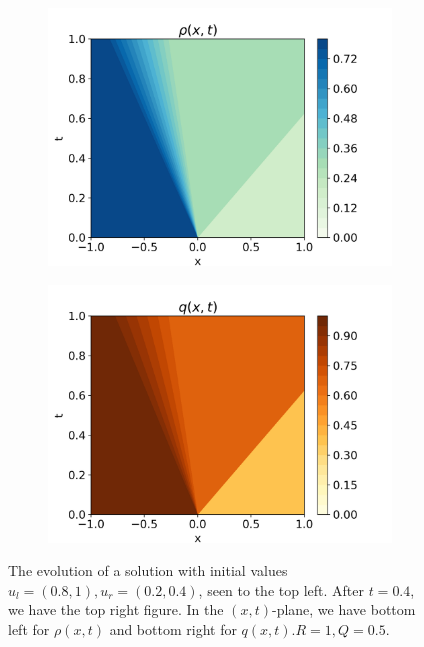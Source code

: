 \documentclass[10pt]{article}
\numberwithin{equation}{section}
\begin{document}
\begin{figure}[H]
\begin{subfigure}[b]{0.35\textwidth}
         \centering
         \includegraphics[width=\textwidth]{Figures/Model/SysRarefacRho.png}
     \end{subfigure}
     \begin{subfigure}[b]{0.35\textwidth}
         \centering
         \includegraphics[width=\textwidth]{Figures/Model/SysRarefacQ.png}
     \end{subfigure}
        \caption{The evolution of a solution with initial values $u_l = (0.8, 1), u_r = (0.2, 0.4)$, seen to the top left. After $t = 0.4$, we have the top right figure. In the $(x,t)$-plane, we have bottom left for $\rho(x,t)$ and bottom right for $q(x,t)$.$R = 1, Q = 0.5$.}
        \label{fig:ExampleSysRarefaction}
\end{figure} \begin{figure}[H]

\end{figure}
\end{document}
